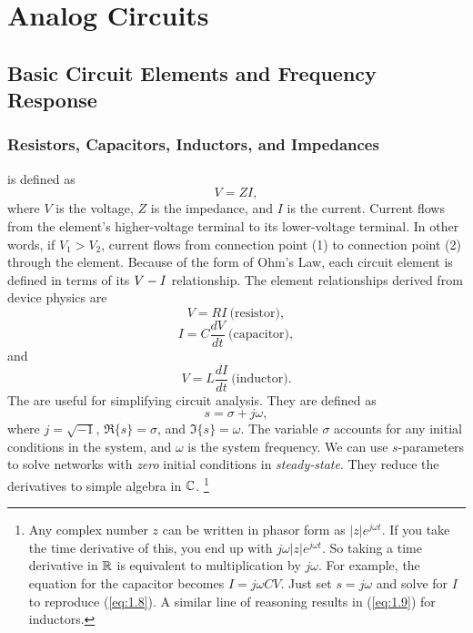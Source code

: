 \chapter{Analog Circuits} \hr
\section{Basic Circuit Elements and Frequency Response}
\subsection{Resistors, Capacitors, Inductors, and Impedances}
 is defined as
\begin{equation}
\label{eq:1.1}
V = Z I,
\end{equation}
where $V$ is the voltage, $Z$ is the impedance, and $I$ is the current. Current flows from the element's higher-voltage terminal to its lower-voltage terminal. In other words, if $V_{1} > V_{2}$, current flows from connection point (1) to connection point (2) through the element.
Because of the form of Ohm's Law, each circuit element is defined in terms of its $V \-- I$ relationship. The element relationships derived from device physics are
\begin{equation}
\label{eq:1.2}
V = R I ~\text{(resistor)},
\end{equation}
\begin{equation}
\label{eq:1.3}
I = C \frac{dV}{dt} ~\text{(capacitor)},
\end{equation}
and
\begin{equation}
\label{eq:1.4}
V = L \frac{dI}{dt} ~\text{(inductor)}.
\end{equation}
The  are useful for simplifying circuit analysis. They are defined as
\begin{equation}
\label{eq:1.5}
s = \sigma + j \omega,
\end{equation}
where $j = \sqrt{-1}$, $\Re\{ s \} = \sigma$, and $\Im\{ s \} = \omega$. The variable $\sigma$ accounts for any initial conditions in the system, and $\omega$ is the system frequency. We can use $s$-parameters to solve networks with \textit{zero} initial conditions in \textit{steady-state}. They reduce the derivatives to simple algebra in $\mathbb{C}$. \footnote{Any complex number $z$ can be written in phasor form as $|z| e^{j \omega t}$. If you take the time derivative of this, you end up with $j \omega |z| e^{j \omega t}$. So taking a time derivative in $\mathbb{R}$ is equivalent to multiplication by $j \omega$. For example, the equation for the capacitor becomes $I = j \omega C V$. Just set $s = j \omega$ and solve for $I$ to reproduce (\ref{eq:1.8}). A similar line of reasoning results in (\ref{eq:1.9}) for inductors.}


